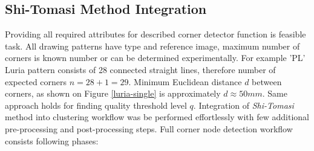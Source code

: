 


\subsection{Shi-Tomasi Method Integration}
Providing all required attributes for described corner detector function is feasible task. All drawing patterns have type and reference image, maximum number of corners is known number or can be determined experimentally. For example 'PL' Luria pattern consists of 28 connected straight lines, therefore number of expected corners $n = 28 + 1 = 29$. Minimum Euclidean distance $d$ between corners, as shown on Figure \ref{luria-single} is approximately $d \approx 50mm$. Same approach holds for finding quality threshold level $q$. Integration of \textit{Shi-Tomasi} method into clustering workflow was be performed effortlessly with few additional pre-processing and post-processing steps. Full corner node detection workflow consists following phases:


